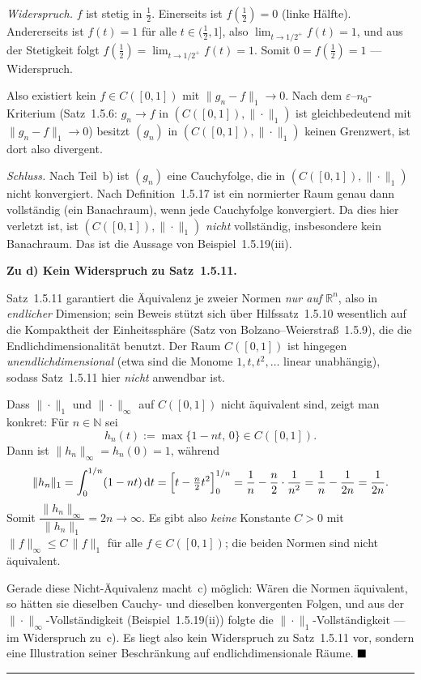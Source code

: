 \documentclass[a4paper,11pt]{article}
\providecommand{\qed}{\hfill\ensuremath{\blacksquare}}
\begin{document}
\emph{Widerspruch.} $f$ ist stetig in $\tfrac12$. Einerseits ist $f(\tfrac12)=0$ (linke Hälfte). Andererseits ist $f(t)=1$ für alle $t\in(\tfrac12,1]$, also $\lim_{t\to 1/2^+}f(t)=1$, und aus der Stetigkeit folgt $f(\tfrac12)=\lim_{t\to 1/2^+}f(t)=1$. Somit $0=f(\tfrac12)=1$ --- Widerspruch.

Also existiert kein $f\in C([0,1])$ mit $\|g_n-f\|_1\to 0$. Nach dem $\varepsilon$--$n_0$-Kriterium (Satz~1.5.6: $g_n\to f$ in $(C([0,1]),\|\cdot\|_1)$ ist gleichbedeutend mit $\|g_n-f\|_1\to 0$) besitzt $(g_n)$ in $(C([0,1]),\|\cdot\|_1)$ keinen Grenzwert, ist dort also divergent.

\emph{Schluss.} Nach Teil~b) ist $(g_n)$ eine Cauchyfolge, die in $(C([0,1]),\|\cdot\|_1)$ nicht konvergiert. Nach Definition~1.5.17 ist ein normierter Raum genau dann vollständig (ein Banachraum), wenn jede Cauchyfolge konvergiert. Da dies hier verletzt ist, ist $(C([0,1]),\|\cdot\|_1)$ \emph{nicht} vollständig, insbesondere kein Banachraum. Das ist die Aussage von Beispiel~1.5.19(iii).

\medskip
\textbf{Zu d) Kein Widerspruch zu Satz~1.5.11.}

Satz~1.5.11 garantiert die Äquivalenz je zweier Normen \emph{nur auf $\mathbb{R}^n$}, also in \emph{endlicher} Dimension; sein Beweis stützt sich über Hilfssatz~1.5.10 wesentlich auf die Kompaktheit der Einheitssphäre (Satz von Bolzano--Weierstraß~1.5.9), die die Endlichdimensionalität benutzt. Der Raum $C([0,1])$ ist hingegen \emph{unendlichdimensional} (etwa sind die Monome $1,t,t^2,\dots$ linear unabhängig), sodass Satz~1.5.11 hier \emph{nicht} anwendbar ist.

Dass $\|\cdot\|_1$ und $\|\cdot\|_\infty$ auf $C([0,1])$ nicht äquivalent sind, zeigt man konkret: Für $n\in\mathbb{N}$ sei
\[
h_n(t):=\max\{1-n t,\,0\}\in C([0,1]).
\]
Dann ist $\|h_n\|_\infty=h_n(0)=1$, während
\[
\|h_n\|_1=\int_0^{1/n}(1-n t)\,\mathrm{d}t=\Bigl[t-\tfrac{n}{2}t^2\Bigr]_0^{1/n}=\frac1n-\frac{n}{2}\cdot\frac1{n^2}=\frac1n-\frac1{2n}=\frac{1}{2n}.
\]
Somit $\dfrac{\|h_n\|_\infty}{\|h_n\|_1}=2n\to\infty$. Es gibt also \emph{keine} Konstante $C>0$ mit $\|f\|_\infty\le C\,\|f\|_1$ für alle $f\in C([0,1])$; die beiden Normen sind nicht äquivalent.

Gerade diese Nicht-Äquivalenz macht~c) möglich: Wären die Normen äquivalent, so hätten sie dieselben Cauchy- und dieselben konvergenten Folgen, und aus der $\|\cdot\|_\infty$-Vollständigkeit (Beispiel~1.5.19(ii)) folgte die $\|\cdot\|_1$-Vollständigkeit --- im Widerspruch zu~c). Es liegt also kein Widerspruch zu Satz~1.5.11 vor, sondern eine Illustration seiner Beschränkung auf endlichdimensionale Räume. $\qed$\par\bigskip\hrule\bigskip
\end{document}
